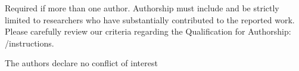 \documentclass[sensors,article,submit,moreauthors,pdftex,12pt,a4paper]{mdpi}
\begin{document}








Required if more than one author. Authorship must include and be strictly limited to researchers who have substantially contributed to the reported work. Please carefully review our criteria regarding the Qualification for Authorship: \web /instructions.



The authors declare no conflict of interest

% 





% 

% 



%


%
\end{document}
